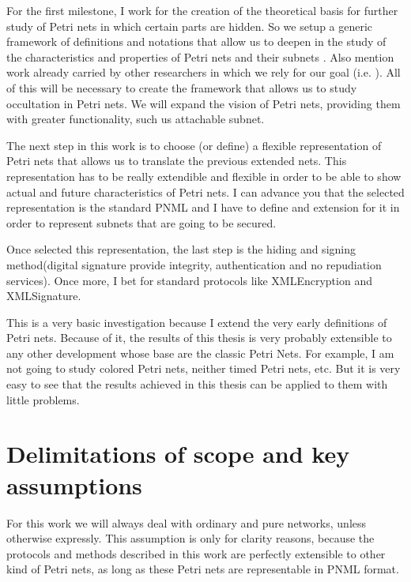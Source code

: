 For the first milestone, I work for the creation
of the theoretical basis for further study of Petri nets
in which certain parts are hidden. So we setup
a generic framework of definitions and notations that allow us to deepen
in the study of the characteristics and properties of Petri nets and their
subnets \citep{G-Murata1989541,G-Silva1985}.
Also mention work already carried
by other researchers in which we rely for
our goal (i.e. \citep{SM-Silva19931,EPN-David2010,EPN-Jensen2009,G-EPN-Peterson1981}). All of this will be necessary to create the framework that allows us to study occultation in Petri nets. We will expand the vision of Petri nets, providing them with greater functionality,
such us attachable subnet.

The next step in this work is to choose (or define) a flexible representation of Petri
nets that allows us to translate the previous extended nets. This representation has to be really extendible and flexible in order to be able to show actual and future characteristics of Petri nets.
I can advance you that the selected representation is the standard PNML and I have to define and extension for it in order to represent subnets that are going to
be secured.

Once selected this representation, the last step is the hiding and signing
method(digital signature provide integrity, authentication and
no repudiation services). Once
more, I bet for standard protocols like XMLEncryption and XMLSignature.

This is a very basic investigation because I extend the very early
definitions of Petri nets. Because of it, the results of this thesis is very probably extensible to any other development whose base are the classic Petri Nets. For example, I am not going to study colored Petri nets, neither timed
Petri nets, etc. But it is very easy to see that the results achieved in
this thesis can be applied to them with little problems.  

\section{Delimitations of scope and key assumptions}  
For this work we will always deal with ordinary and pure networks, unless otherwise expressly. This assumption is only for clarity reasons, because
the protocols and methods described in this work are perfectly extensible
to other kind of Petri nets, as long as these Petri nets are representable
in PNML format.





